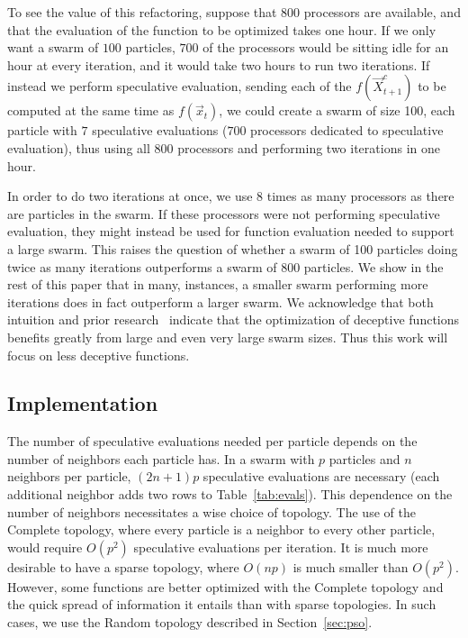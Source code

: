 \documentclass{llncs}
\renewcommand{\sec}[1]{Section~\ref{sec:#1}}
\providecommand{\ppos}{\ensuremath{\Vec{x}}}
\providecommand{\ofunc}{\ensuremath{f}}
\providecommand{\specpos}{\ensuremath{\vec{X}}}
\begin{document}
To see the value of this refactoring, suppose that $800$ processors are
available, and that the evaluation of the function to be optimized takes one
hour.  If we only want a swarm of $100$ particles, $700$ of the processors
would be sitting idle for an hour at every iteration, and it would take two
hours to run two iterations.  If instead we perform speculative evaluation,
sending each of the $\ofunc(\specpos_{t+1}^{c})$ to be computed at the same
time as $\ofunc(\ppos_{t})$, we could create a swarm of size 100, each particle
with $7$ speculative evaluations ($700$ processors dedicated to speculative
evaluation), thus using all $800$ processors and performing two iterations in
one hour.

In order to do two iterations at once, we use 8 times as many processors as
there are particles in the swarm.  If these processors were not performing
speculative evaluation, they might instead be used for function evaluation
needed to support a large swarm.  This raises the question of whether a swarm
of 100 particles doing twice as many iterations outperforms a swarm of 800
particles.  We show in the rest of this paper that in many, instances, a
smaller swarm performing more iterations does in fact outperform a larger
swarm.  We acknowledge that both intuition and prior
research~\cite{mcnabb-2009-large-particle-swarms} indicate that the
optimization of deceptive functions benefits greatly from large and even very
large swarm sizes. Thus this work will focus on less deceptive functions.

\subsection{Implementation}
\label{sec:implementation}

The number of speculative evaluations needed per particle depends on the number
of neighbors each particle has.  In a swarm with $p$ particles and $n$
neighbors per particle, $(2n+1)p$ speculative evaluations are necessary (each
additional neighbor adds two rows to Table~\ref{tab:evals}).  This dependence
on the number of neighbors necessitates a wise choice of topology.  The use of
the Complete topology, where every particle is a neighbor to every other
particle, would require $O(p^2)$ speculative evaluations per iteration.  It is
much more desirable to have a sparse topology, where $O(np)$ is much smaller
than $O(p^2)$.  However, some functions are better optimized with the Complete
topology and the quick spread of information it entails than with sparse
topologies.  In such cases, we use the Random topology described in \sec{pso}.
\end{document}
